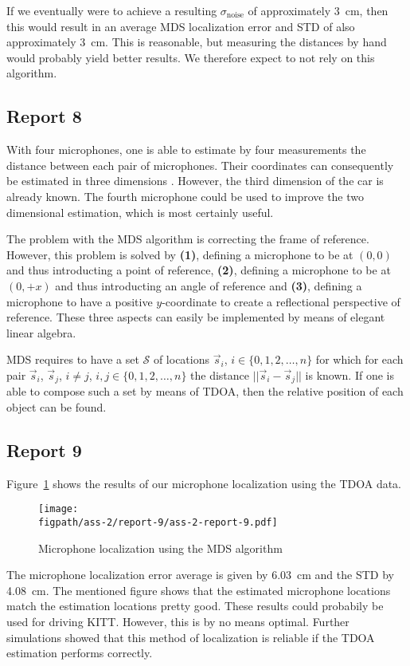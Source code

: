 \documentclass[11pt,titlepage]{report}
\newcommand{\figpath}{../../deliverable-7-resources/figures}
\begin{document}
If we eventually were to achieve a resulting $\sigma_{\text{noise}}$ of approximately \SI{3}{cm}, then this would result in an average MDS localization error and STD of also approximately \SI{3}{cm}. This is reasonable, but measuring the distances by hand would probably yield better results. We therefore expect to not rely on this algorithm.

\subsection{Report 8}
With four microphones, one is able to estimate by four measurements the distance between each pair of microphones. Their coordinates can consequently be estimated in three dimensions \cite{shang-wheeler-mds}. However, the third dimension of the car is already known. The fourth microphone could be used to improve the two dimensional estimation, which is most certainly useful.

The problem with the MDS algorithm is correcting the frame of reference. However, this problem is solved by \textbf{(1)}, defining a microphone to be at $(0,0)$ and thus introducting a point of reference, \textbf{(2)}, defining a microphone to be at $(0,+x)$ and thus introducting an angle of reference and \textbf{(3)}, defining a microphone to have a positive $y$-coordinate to create a reflectional perspective of reference. These three aspects can easily be implemented by means of elegant linear algebra.

MDS requires to have a set $\mathcal{S}$ of locations $\vec{s}_i$, $i \in \{0,1,2,\dots,n\}$ for which for each pair $\vec{s}_i$, $\vec{s}_j$, $i \neq j$, $i, j \in \{0,1,2,\dots,n\}$ the distance $||\vec{s}_i-\vec{s}_j||$ is known. If one is able to compose such a set by means of TDOA, then the relative position of each object can be found.

\subsection{Report 9}
\label{subsec:ass-2-rep-9}
Figure~\ref{fig:ass-2-rep-9} shows the results of our microphone localization using the TDOA data.

\begin{figure}[H]
	\begin{center}
		\texttt{[image: \\figpath/ass-2/report-9/ass-2-report-9.pdf]}
	\end{center}
	\caption{Microphone localization using the MDS algorithm}
	\label{fig:ass-2-rep-9}
\end{figure}

The microphone localization error average is given by \SI{6.03}{cm} and the STD by \SI{4.08}{cm}. The mentioned figure shows that the estimated microphone locations match the estimation locations pretty good. These results could probabily be used for driving KITT. However, this is by no means optimal. Further simulations showed that this method of localization is reliable if the TDOA estimation performs correctly.
\end{document}
